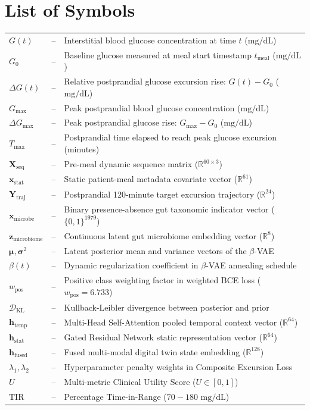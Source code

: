 \documentclass[a4paper, 12pt]{report}
\theoremstyle{definition}
\begin{document}
	\section*{{\huge List of Symbols}\hfill} 
	\vspace{0.8cm}
	\begin{tabular}{lll}
    $G(t)$ &--& Interstitial blood glucose concentration at time $t$ ($\text{mg/dL}$) \\
    $G_0$ &--& Baseline glucose measured at meal start timestamp $t_{\text{meal}}$ ($\text{mg/dL}$) \\
    $\Delta G(t)$ &--& Relative postprandial glucose excursion rise: $G(t) - G_0$ ($\text{mg/dL}$) \\
    $G_{\max}$ &--& Peak postprandial blood glucose concentration ($\text{mg/dL}$) \\
    $\Delta G_{\max}$ &--& Peak postprandial glucose rise: $G_{\max} - G_0$ ($\text{mg/dL}$) \\
    $T_{\max}$ &--& Postprandial time elapsed to reach peak glucose excursion (minutes) \\
    $\mathbf{X}_{\text{seq}}$ &--& Pre-meal dynamic sequence matrix ($\mathbb{R}^{60 \times 3}$) \\
    $\mathbf{x}_{\text{stat}}$ &--& Static patient-meal metadata covariate vector ($\mathbb{R}^{61}$) \\
    $\mathbf{Y}_{\text{traj}}$ &--& Postprandial 120-minute target excursion trajectory ($\mathbb{R}^{24}$) \\
    $\mathbf{x}_{\text{microbe}}$ &--& Binary presence-absence gut taxonomic indicator vector ($\{0, 1\}^{1979}$) \\
    $\mathbf{z}_{\text{microbiome}}$ &--& Continuous latent gut microbiome embedding vector ($\mathbb{R}^8$) \\
    $\boldsymbol{\mu}, \boldsymbol{\sigma}^2$ &--& Latent posterior mean and variance vectors of the $\beta$-VAE \\
    $\beta(t)$ &--& Dynamic regularization coefficient in $\beta$-VAE annealing schedule \\
    $w_{\text{pos}}$ &--& Positive class weighting factor in weighted BCE loss ($w_{\text{pos}} = 6.733$) \\
    $\mathcal{D}_{\text{KL}}$ &--& Kullback-Leibler divergence between posterior and prior \\
    $\mathbf{h}_{\text{temp}}$ &--& Multi-Head Self-Attention pooled temporal context vector ($\mathbb{R}^{64}$) \\
    $\mathbf{h}_{\text{stat}}$ &--& Gated Residual Network static representation vector ($\mathbb{R}^{64}$) \\
    $\mathbf{h}_{\text{fused}}$ &--& Fused multi-modal digital twin state embedding ($\mathbb{R}^{128}$) \\
    $\lambda_1, \lambda_2$ &--& Hyperparameter penalty weights in Composite Excursion Loss \\
    $U$ &--& Multi-metric Clinical Utility Score ($U \in [0, 1]$) \\
    $\text{TIR}$ &--& Percentage Time-in-Range ($70 - 180\text{ mg/dL}$) \\
	\end{tabular}
\end{document}
